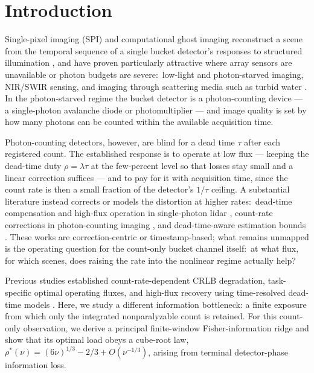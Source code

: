 \documentclass[10pt,twocolumn]{article}
\begin{document}
\section{Introduction}
Single-pixel imaging (SPI) and computational ghost imaging reconstruct a
scene from the temporal sequence of a single bucket detector's responses
to structured illumination \cite{duarte2008singlepixel,shapiro2008computational,
edgar2019principles}, and have proven particularly attractive where array
sensors are unavailable or photon budgets are severe:\ low-light and
photon-starved imaging, NIR/SWIR sensing, and imaging through scattering
media such as turbid water \cite{hao2025photonlimited,hao2025randommedia,
hao2025complexfield}. In the photon-starved regime the bucket detector is
a photon-counting device --- a single-photon avalanche diode or
photomultiplier --- and image quality is set by how many photons can be
counted within the available acquisition time.

Photon-counting detectors, however, are blind for a dead time $\tau$
after each registered count. The established response is to operate at
low flux --- keeping the dead-time duty $\rho = \lambda\tau$ at the few-percent
level so that losses stay small and a linear correction suffices --- and to
pay for it with acquisition time, since the count rate is then a small
fraction of the detector's $1/\tau$ ceiling. A substantial literature
instead corrects or models the distortion at higher rates:\ dead-time
compensation and high-flux operation in single-photon lidar
\cite{rapp2019deadtime,rapp2021highflux,gupta2019photonflooded,
gupta2019asynchronous}, count-rate corrections in photon-counting
imaging \cite{liu2021photoncounting}, and dead-time-aware estimation
bounds \cite{jorgensen2026deadtime}. These works are
correction-centric or timestamp-based; what remains unmapped is the
operating question for the count-only bucket channel itself:\ at what
flux, for which scenes, does raising the rate into the nonlinear regime
actually help?

Previous studies established count-rate-dependent CRLB degradation,
task-specific optimal operating fluxes, and high-flux recovery using
time-resolved dead-time models \cite{wang2011pileup,becares2012deadtime,
gupta2019photonflooded,rapp2019deadtime,jorgensen2026deadtime}. Here,
we study a different information bottleneck: a finite exposure from which only
the integrated nonparalyzable count is retained. For this count-only
observation, we derive a principal finite-window Fisher-information ridge and
show that its optimal load obeys a cube-root law, $\rho^{*}(\nu) =
(6\nu)^{1/3} - 2/3 + O(\nu^{-1/3})$, arising from terminal detector-phase
information loss.
\end{document}
